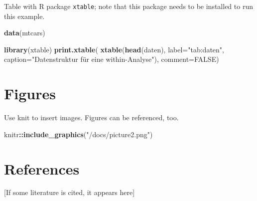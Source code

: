\documentclass[11pt,ngerman,a4paper,oneside]{article}
\newenvironment{Shaded}{\begin{snugshade}}{\end{snugshade}}
\newcommand{\DataTypeTok}[1]{\textcolor[rgb]{0.13,0.29,0.53}{#1}}
\newcommand{\KeywordTok}[1]{\textcolor[rgb]{0.13,0.29,0.53}{\textbf{#1}}}
\newcommand{\NormalTok}[1]{#1}
\newcommand{\OperatorTok}[1]{\textcolor[rgb]{0.81,0.36,0.00}{\textbf{#1}}}
\newcommand{\OtherTok}[1]{\textcolor[rgb]{0.56,0.35,0.01}{#1}}
\newcommand{\StringTok}[1]{\textcolor[rgb]{0.31,0.60,0.02}{#1}}
\begin{document}
Table with R package \texttt{xtable}; note that this package needs to be
installed to run this example.

\begin{Shaded}
\begin{Highlighting}[]
\KeywordTok{data}\NormalTok{(mtcars)}

\KeywordTok{library}\NormalTok{(xtable)}
\KeywordTok{print.xtable}\NormalTok{(}
  \KeywordTok{xtable}\NormalTok{(}\KeywordTok{head}\NormalTok{(daten), }
         \DataTypeTok{label=}\StringTok{"tab:daten"}\NormalTok{, }
         \DataTypeTok{caption=}\StringTok{"Datenstruktur für eine within{-}Analyse"}\NormalTok{), }
  \DataTypeTok{comment=}\OtherTok{FALSE}\NormalTok{)}
\end{Highlighting}
\end{Shaded}

\hypertarget{figures}{%
\section{Figures}\label{figures}}

Use knit to insert images. Figures can be referenced, too.

\begin{Shaded}
\begin{Highlighting}[]
\NormalTok{knitr}\OperatorTok{::}\KeywordTok{include\_graphics}\NormalTok{(}\StringTok{"/docs/picture2.png"}\NormalTok{)}
\end{Highlighting}
\end{Shaded}

\hypertarget{references}{%
\section{References}\label{references}}

{[}If some literature is cited, it appears here{]}

\setlength{\parindent}{-0.5in}
\setlength{\leftskip}{0.5in}
\end{document}
